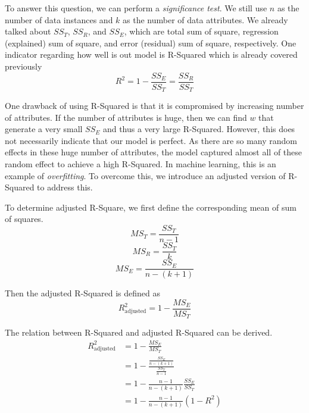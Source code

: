 \documentclass[
	letterpaper
]{article}
\begin{document}
To answer this question, we can perform a \textit{significance test}.
We still use $n$ as the number of data instances and $k$ as the number of data attributes.
We already talked about $SS_T$, $SS_R$, and $SS_E$, which are total sum of square, regression (explained) sum of square, and error (residual) sum of square, respectively.
One indicator regarding how well is out model is R-Squared which is already covered previously
\begin{equation}
R^2 = 1 - \frac{SS_E}{SS_T} = \frac{SS_R}{SS_T}
\end{equation}

One drawback of using R-Squared is that it is compromised by increasing number of attributes.
If the number of attributes is huge, then we can find $w$ that generate a very small $SS_E$ and thus a very large R-Squared.
However, this does not necessarily indicate that our model is perfect.
As there are so many random effects in these huge number of attributes, the model captured almost all of these random effect to achieve a high R-Squared.
In machine learning, this is an example of \textit{overfitting}.
To overcome this, we introduce an adjusted version of R-Squared to address this.

To determine adjusted R-Square, we first define the corresponding mean of sum of squares.
\begin{equation}
MS_T = \frac{SS_T}{n-1}
\end{equation}
\begin{equation}
MS_R = \frac{SS_T}{k}
\end{equation}
\begin{equation}
MS_E = \frac{SS_E}{n-(k+1)}
\end{equation}

Then the adjusted R-Squared is defined as
\begin{equation}
R_{\text{adjusted}}^2 = 1 - \frac{MS_E}{MS_T}
\end{equation}

The relation between R-Squared and adjusted R-Squared can be derived.
\begin{equation}
\begin{split}
R_{\text{adjusted}}^2 &= 1 - \frac{MS_E}{MS_T}\\
& =  1 - \frac{\frac{SS_E}{n-(k+1)}}{\frac{SS_T}{n-1}}\\
& = 1 - \frac{n-1}{n-(k+1)} \frac{SS_E}{SS_T}\\
& = 1 - \frac{n-1}{n-(k+1)} (1-R^2)
\end{split}
\end{equation}
\end{document}
